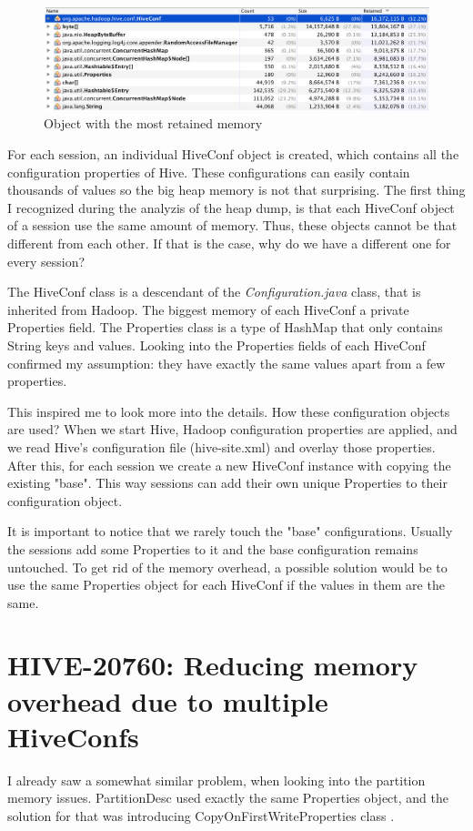 \begin{figure}[H]
	\includegraphics[width=150mm, keepaspectratio]{figures/hiveconf_memory.png}
	\centering
	\caption{Object with the most retained memory}
\end{figure}

For each session, an individual HiveConf object is created, which contains all the configuration properties of Hive. These configurations can easily contain thousands of values so the big heap memory is not that surprising. The first thing I recognized during the analyzis of the heap dump, is that each HiveConf object of a session use the same amount of memory. Thus, these objects cannot be that different from each other. If that is the case, why do we have a different one for every session?

The HiveConf class is a descendant of the \textit{Configuration.java} class, that is inherited from Hadoop. The biggest memory of each HiveConf a private Properties field. The Properties class is a type of HashMap that only contains String keys and values. Looking into the Properties fields of each HiveConf confirmed my assumption: they have exactly the same values apart from a few properties.

This inspired me to look more into the details. How these configuration objects are used? When we start Hive, Hadoop configuration properties are applied, and we read Hive's configuration file (hive-site.xml) and overlay those properties. After this, for each session we create a new HiveConf instance with copying the existing "base". This way sessions can add their own unique Properties to their configuration object. 

It is important to notice that we rarely touch the "base" configurations. Usually the sessions add some Properties to it and the base configuration remains untouched. To get rid of the memory overhead, a possible solution would be to use the same Properties object for each HiveConf if the values in them are the same.

\section{HIVE-20760: Reducing memory overhead due to multiple HiveConfs}
I already saw a somewhat similar problem, when looking into the partition memory issues. PartitionDesc used exactly the same Properties object, and the solution for that was introducing CopyOnFirstWriteProperties class \cite{hive-partitions}. 

